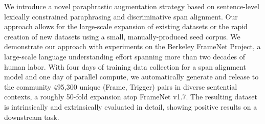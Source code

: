 We introduce a novel paraphrastic augmentation strategy based on sentence-level lexically constrained paraphrasing and discriminative span alignment. Our approach allows for the large-scale expansion of existing datasets or the rapid creation of new datasets using a small, manually-produced seed corpus. We demonstrate our approach with experiments on the Berkeley FrameNet Project, a large-scale language understanding effort spanning more than two decades of human labor. With four days of training data collection for a span alignment model and one day of parallel compute, we automatically generate and release to the community 495,300 unique (Frame, Trigger) pairs in diverse sentential contexts, a roughly 50-fold expansion atop FrameNet v1.7. The resulting dataset is intrinsically and extrinsically evaluated in detail, showing positive results on a downstream task.